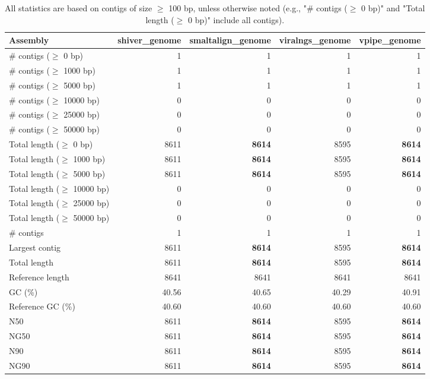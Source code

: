 \documentclass[12pt,a4paper]{article}
\begin{document}
\begin{table}[ht]
\begin{center}
\caption{All statistics are based on contigs of size $\geq$ 100 bp, unless otherwise noted (e.g., "\# contigs ($\geq$ 0 bp)" and "Total length ($\geq$ 0 bp)" include all contigs).}
\begin{tabular}{|l*{4}{|r}|}
\hline
Assembly & shiver\_genome & smaltalign\_genome & viralngs\_genome & vpipe\_genome \\ \hline
\# contigs ($\geq$ 0 bp) & 1 & 1 & 1 & 1 \\ \hline
\# contigs ($\geq$ 1000 bp) & 1 & 1 & 1 & 1 \\ \hline
\# contigs ($\geq$ 5000 bp) & 1 & 1 & 1 & 1 \\ \hline
\# contigs ($\geq$ 10000 bp) & 0 & 0 & 0 & 0 \\ \hline
\# contigs ($\geq$ 25000 bp) & 0 & 0 & 0 & 0 \\ \hline
\# contigs ($\geq$ 50000 bp) & 0 & 0 & 0 & 0 \\ \hline
Total length ($\geq$ 0 bp) & 8611 & {\bf 8614} & 8595 & {\bf 8614} \\ \hline
Total length ($\geq$ 1000 bp) & 8611 & {\bf 8614} & 8595 & {\bf 8614} \\ \hline
Total length ($\geq$ 5000 bp) & 8611 & {\bf 8614} & 8595 & {\bf 8614} \\ \hline
Total length ($\geq$ 10000 bp) & 0 & 0 & 0 & 0 \\ \hline
Total length ($\geq$ 25000 bp) & 0 & 0 & 0 & 0 \\ \hline
Total length ($\geq$ 50000 bp) & 0 & 0 & 0 & 0 \\ \hline
\# contigs & 1 & 1 & 1 & 1 \\ \hline
Largest contig & 8611 & {\bf 8614} & 8595 & {\bf 8614} \\ \hline
Total length & 8611 & {\bf 8614} & 8595 & {\bf 8614} \\ \hline
Reference length & 8641 & 8641 & 8641 & 8641 \\ \hline
GC (\%) & 40.56 & 40.65 & 40.29 & 40.91 \\ \hline
Reference GC (\%) & 40.60 & 40.60 & 40.60 & 40.60 \\ \hline
N50 & 8611 & {\bf 8614} & 8595 & {\bf 8614} \\ \hline
NG50 & 8611 & {\bf 8614} & 8595 & {\bf 8614} \\ \hline
N90 & 8611 & {\bf 8614} & 8595 & {\bf 8614} \\ \hline
NG90 & 8611 & {\bf 8614} & 8595 & {\bf 8614} \\ \hline

\end{tabular}
\end{center}
\end{table}
\end{document}
